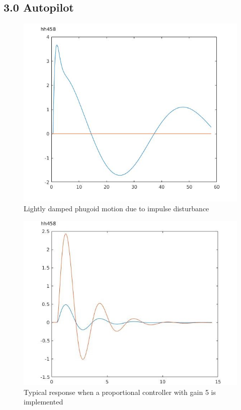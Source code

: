 \documentclass[twoside,twocolumn]{article}
\begin{document}
\subsection{3.0 Autopilot}
\begin{figure}[h]
  \centering
    \includegraphics[width=\linewidth]{3_min_wait}
  \caption{Lightly damped phugoid motion due to impulse disturbance }
  \label{fig:3phugoid}
\end{figure}

\begin{figure}[h]
  \centering
    \includegraphics[width=\linewidth]{3_kp=5}
  \caption{Typical response when a proportional controller with gain 5 is implemented}
  \label{fig:3kp5}
\end{figure}
\end{document}
